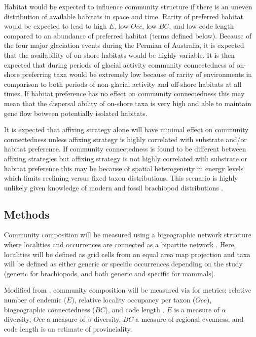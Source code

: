 \documentclass[12pt,letterpaper]{article}
\begin{document}
Habitat would be expected to influence community structure if there is an uneven distribution of available habitats in space and time. Rarity of preferred habitat would be expected to lead to high \(E\), low \(Occ\), low \(BC\), and low code length compared to an abundance of preferred habitat (terms defined below). Because of the four major glaciation events during the Permian of Australia, it is expected that the availability of on-shore habitats would be highly variable. It is then expected that during periods of glacial activity community connectedness of on-shore preferring taxa would be extremely low because of rarity of environments in comparison to both periods of non-glacial activity and off-shore habitats at all times. If habitat preference has no effect on community connectedness this may mean that the dispersal ability of on-shore taxa is very high and able to maintain gene flow between potentially isolated habitats.

It is expected that affixing strategy alone will have minimal effect on community connectedness unless affixing strategy is highly correlated with substrate and/or habitat preference. If community connectedness is found to be different between affixing strategies but affixing strategy is not highly correlated with substrate or habitat preference this may be because of spatial heterogeneity in energy levels which limits reclining versus fixed taxon distributions. This scenario is highly unlikely given knowledge of modern and fossil brachiopod distributions \citep{Rudwick1970,Richardson1997,Richardson1997a}.

\subsection{Methods}
Community composition will be measured using a bigeographic network structure where localities and occurrences are connected as a bipartite network \citep{Sidor2013,Vilhena2013,Vilhena2013b}. Here, localities will be defined as grid cells from an equal area map projection and taxa will be defined as either generic or specific occurrences depending on the study (generic for brachiopods, and both generic and specific for mammals). 

Modified from \citet{Sidor2013}, community composition will be measured via for metrics: relative number of endemic (\(E\)), relative locality occupancy per taxon (\(Occ\)), biogeographic connectedness (\(BC\)), and code length \citep{Rosvall2008,Rosvall2009a}. \(E\) is a measure of \(\alpha\) diversity, \(Occ\) a measure of \(\beta\) diversity, \(BC\) a measure of regional evenness, and code length is an estimate of provinciality.
\end{document}
